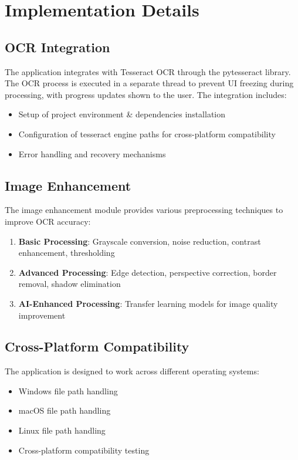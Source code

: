 \documentclass[12pt]{article}
\begin{document}
\section{Implementation Details}

\subsection{OCR Integration}
The application integrates with Tesseract OCR through the pytesseract library. The OCR process is executed in a separate thread to prevent UI freezing during processing, with progress updates shown to the user. The integration includes:
\begin{itemize}
    \item Setup of project environment \& dependencies installation
    \item Configuration of tesseract engine paths for cross-platform compatibility
    \item Error handling and recovery mechanisms
\end{itemize}

\subsection{Image Enhancement}
The image enhancement module provides various preprocessing techniques to improve OCR accuracy:
\begin{enumerate}
    \item \textbf{Basic Processing}: Grayscale conversion, noise reduction, contrast enhancement, thresholding
    \item \textbf{Advanced Processing}: Edge detection, perspective correction, border removal, shadow elimination
    \item \textbf{AI-Enhanced Processing}: Transfer learning models for image quality improvement
\end{enumerate}

\subsection{Cross-Platform Compatibility}
The application is designed to work across different operating systems:
\begin{itemize}
    \item Windows file path handling
    \item macOS file path handling
    \item Linux file path handling
    \item Cross-platform compatibility testing
\end{itemize}
\end{document}
